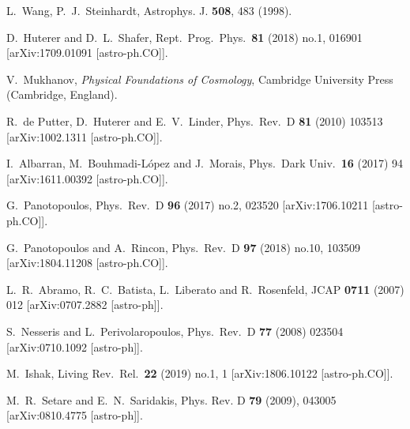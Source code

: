 \documentclass[aps,prd,amsmath,amssymb]{revtex4}
\begin{document}
\begin{thebibliography}{99}
 L.~Wang, P.~J.~Steinhardt, Astrophys. J. {\bf 508}, 483 (1998).

 D.~Huterer and D.~L.~Shafer,
  Rept.\ Prog.\ Phys.\  {\bf 81} (2018) no.1,  016901
  [arXiv:1709.01091 [astro-ph.CO]].
  
 V.~Mukhanov, \textit{Physical Foundations of Cosmology},
Cambridge University Press (Cambridge, England).

 R.~de Putter, D.~Huterer and E.~V.~Linder,
  Phys.\ Rev.\ D {\bf 81} (2010) 103513
  [arXiv:1002.1311 [astro-ph.CO]].

 I.~Albarran, M.~Bouhmadi-López and J.~Morais,
  Phys.\ Dark Univ.\  {\bf 16} (2017) 94
  [arXiv:1611.00392 [astro-ph.CO]].

 G.~Panotopoulos,
  Phys.\ Rev.\ D {\bf 96} (2017) no.2,  023520
  [arXiv:1706.10211 [astro-ph.CO]].

 G.~Panotopoulos and A.~Rincon,
  Phys.\ Rev.\ D {\bf 97} (2018) no.10,  103509
  [arXiv:1804.11208 [astro-ph.CO]].  
  
 L.~R.~Abramo, R.~C.~Batista, L.~Liberato and R.~Rosenfeld,
  JCAP {\bf 0711} (2007) 012
  [arXiv:0707.2882 [astro-ph]].

 S.~Nesseris and L.~Perivolaropoulos,
  Phys.\ Rev.\ D {\bf 77} (2008) 023504
  [arXiv:0710.1092 [astro-ph]].
  
 M.~Ishak,
  Living Rev.\ Rel.\  {\bf 22} (2019) no.1,  1
  [arXiv:1806.10122 [astro-ph.CO]].  

 M.~R.~Setare and E.~N.~Saridakis,
Phys. Rev. D \textbf{79} (2009), 043005
[arXiv:0810.4775 [astro-ph]].


\end{thebibliography}
\end{document}
